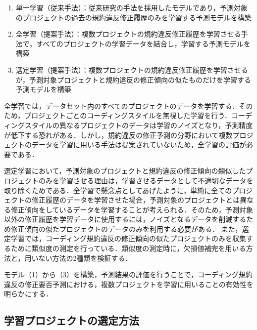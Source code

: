 \documentclass[paper]{ieicej}
\begin{document}
\begin{enumerate}
  \item 単一学習（従来手法）：従来研究の手法を採用したモデルであり，予測対象のプロジェクトの過去の規約違反修正履歴のみを学習する予測モデルを構築\cite{JyuraiPre}
  \item 全学習（提案手法）：複数プロジェクトの規約違反修正履歴を学習させる手法で，すべてのプロジェクトの学習データを結合し，学習する予測モデルを構築
  \item 選定学習（提案手法）：複数プロジェクトの規約違反修正履歴を学習させるが，予測対象プロジェクトと規約違反の修正傾向の似たものだけを学習する予測モデルを構築
\end{enumerate}

全学習では，データセット内のすべてのプロジェクトのデータを学習する．そのため，プロジェクトごとのコーディングスタイルを無視した学習を行う．コーディングスタイルの異なるプロジェクトのデータは学習のノイズとなり，予測精度が低下する恐れがある．しかし，規約違反の修正予測の分野において複数プロジェクトのデータを学習に用いる手法は提案されていないため，全学習の評価が必要である．

選定学習において，予測対象のプロジェクトと規約違反の修正傾向の類似したプロジェクトのみを学習させる理由は，学習させるデータとして不適切なデータを取り除くためである．全学習で懸念点としてあげたように，単純に全てのプロジェクトの修正履歴のデータを学習させた場合，予測対象のプロジェクトとは異なる修正傾向をしているデータを学習することが考えられる．そのため，予測対象以外の修正履歴を学習データに使用するには，ノイズとなるデータを削減するため修正傾向の似たプロジェクトのデータのみを利用する必要がある．
また，選定学習では，コーディング規約違反の修正傾向の似たプロジェクトのみを収集するために類似度の測定を行っている．類似度の測定時に，欠損値補完を用いる方法と，用いない方法の2種類を検証する．



モデル（1）から（3）を構築，予測結果の評価を行うことで，コーディング規約違反の修正要否予測における，複数プロジェクトを学習に用いることの有効性を明らかにする．




\subsection{学習プロジェクトの選定方法} \label{chap:選定方法}
\end{document}
